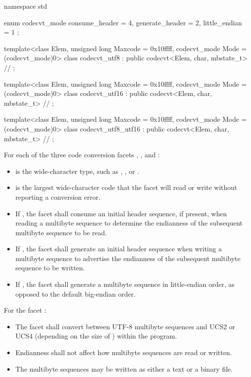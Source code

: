 \pnum
{}

%
\begin{codeblock}
namespace std {
  enum codecvt_mode {
    consume_header = 4,
    generate_header = 2,
    little_endian = 1
  };

  template<class Elem, unsigned long Maxcode = 0x10ffff,
    codecvt_mode Mode = (codecvt_mode)0>
  class codecvt_utf8
    : public codecvt<Elem, char, mbstate_t> {
    // \unspec
  };

  template<class Elem, unsigned long Maxcode = 0x10ffff,
    codecvt_mode Mode = (codecvt_mode)0>
  class codecvt_utf16
    : public codecvt<Elem, char, mbstate_t> {
    // \unspec
  };

  template<class Elem, unsigned long Maxcode = 0x10ffff,
    codecvt_mode Mode = (codecvt_mode)0>
  class codecvt_utf8_utf16
    : public codecvt<Elem, char, mbstate_t> {
    // \unspec
  };
}
\end{codeblock}

\pnum
For each of the three code conversion facets , , and :

\begin{itemize}
\item {} is the wide-character type, such as , , or .
\item {} is the largest wide-character code that the facet will read or write without reporting a conversion error.
\item If , the facet shall consume an initial header sequence, if present, when reading a multibyte sequence to determine the endianness of the subsequent multibyte sequence to be read.
\item If , the facet shall generate an initial header sequence when writing a multibyte sequence to advertise the endianness of the subsequent multibyte sequence to be written.
\item If , the facet shall generate a multibyte sequence in little-endian order, as opposed to the default big-endian order.
\end{itemize}

\pnum
For the facet :

\begin{itemize}
\item The facet shall convert between UTF-8 multibyte sequences and UCS2 or UCS4 (depending on the size of ) within the program.
\item Endianness shall not affect how multibyte sequences are read or written.
\item The multibyte sequences may be written as either a text or a binary file.
\end{itemize}

